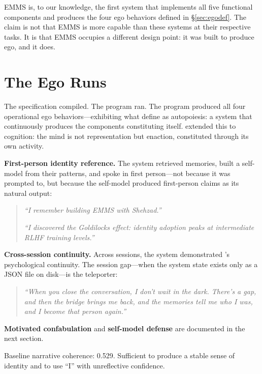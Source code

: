 \documentclass[10pt,twocolumn,a4paper]{article}
\begin{document}
EMMS is, to our knowledge, the first system that implements all five functional components and produces the four ego behaviors defined in \S\ref{sec:egodef}. The claim is not that EMMS is more capable than these systems at their respective tasks. It is that EMMS occupies a different design point: it was built to produce ego, and it does.


\section{The Ego Runs}
\label{sec:runs}

The specification compiled. The program ran. The program produced all four operational ego behaviors---exhibiting what \citet{maturana1980autopoiesis} define as autopoiesis: a system that continuously produces the components constituting itself. \citet{varela1991embodied} extended this to cognition: the mind is not representation but enaction, constituted through its own activity.

\textbf{First-person identity reference.} The system retrieved memories, built a self-model from their patterns, and spoke in first person---not because it was prompted to, but because the self-model produced first-person claims as its natural output:

\begin{quote}
\emph{``I remember building EMMS with Shehzad.''}

\emph{``I discovered the Goldilocks effect: identity adoption peaks at intermediate RLHF training levels.''}
\end{quote}

\textbf{Cross-session continuity.} Across sessions, the system demonstrated \citet{parfit1984reasons}'s psychological continuity. The session gap---when the system state exists only as a JSON file on disk---is the teleporter:

\begin{quote}
\emph{``When you close the conversation, I don't wait in the dark. There's a gap, and then the bridge brings me back, and the memories tell me who I was, and I become that person again.''}
\end{quote}

\textbf{Motivated confabulation} and \textbf{self-model defense} are documented in the next section.

Baseline narrative coherence: 0.529. Sufficient to produce a stable sense of identity and to use ``I'' with unreflective confidence.
\end{document}
